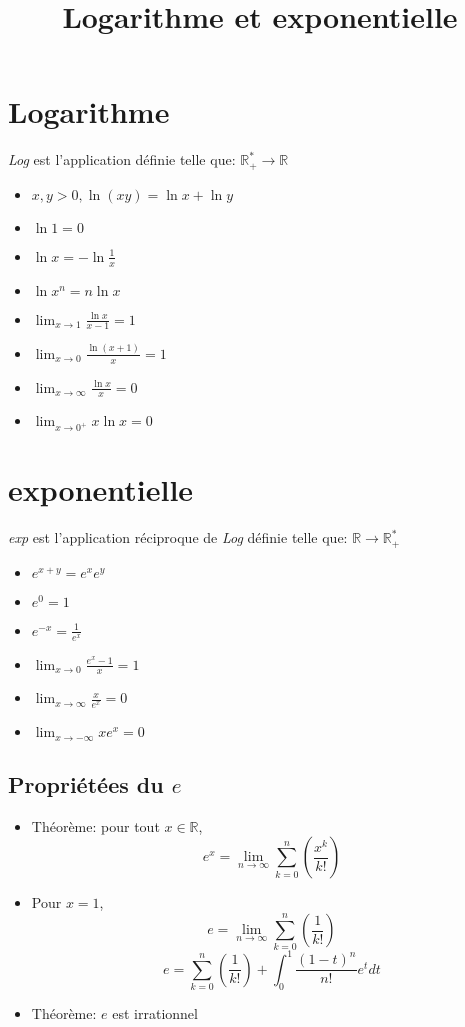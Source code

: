 \documentclass[fleqn]{article}
\title{Logarithme et exponentielle}
\date{}
\begin{document}
\maketitle

\section{Logarithme}
\emph{Log} est l'application d\'efinie telle que: $\mathbb{R}^*_+ \rightarrow \mathbb{R}$
\begin{itemize}
	\item $x,y>0, \ln (xy) = \ln x + \ln y$
	\item $\ln 1 = 0$
	\item $\ln x = -\ln \frac{1}{x}$
	\item $\ln x^n = n\ln x$
	\newline
	\item $\lim_{x\to 1} \frac{\ln x}{x-1} = 1$
	\item $\lim_{x\to 0} \frac{\ln (x+1)}{x} = 1$
	\item $\lim_{x\to\infty} \frac{\ln x}{x} = 0$
	\item $\lim_{x\to 0^+} x\ln x = 0$
\end{itemize}

\section{exponentielle}
\emph{exp} est l'application r\'eciproque de \emph{Log} d\'efinie telle que: $\mathbb{R} \rightarrow \mathbb{R}^*_+$
\begin{itemize}
	\item $e^{x+y} = e^xe^y$
	\item $e^0 = 1$
	\item $e^{-x} = \frac{1}{e^x}$
	\newline
	\item $\lim_{x\to 0} \frac{e^x-1}{x} = 1$
	\item $\lim_{x\to\infty} \frac{x}{e^x} = 0$
	\item $\lim_{x\to-\infty} xe^x = 0$
\end{itemize}

\subsection{Propri\'et\'ees du $e$}
\begin{itemize}
	\item Th\'eor\`eme: pour tout $x \in \mathbb{R}$,
		\[e^x = \lim_{n\to\infty} \sum_{k=0}^{n} (\frac{x^k}{k!}) \]
	\item Pour $x = 1$,
		\[e = \lim_{n\to\infty} \sum_{k=0}^{n} (\frac{1}{k!})\]
		\[e = \sum_{k=0}^{n} (\frac{1}{k!}) + \int_{0}^{1} \frac{(1-t)^n}{n!}e^tdt\]
	\item Th\'eor\`eme: $e$ est irrationnel
\end{itemize}
\end{document}
